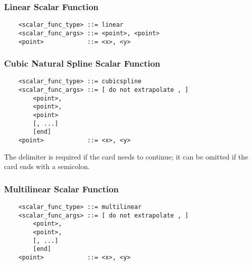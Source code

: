 \subsubsection{Linear Scalar Function}
\begin{verbatim}
    <scalar_func_type> ::= linear
    <scalar_func_args> ::= <point>, <point>
    <point>            ::= <x>, <y>
\end{verbatim}

\subsubsection{Cubic Natural Spline Scalar Function}
\begin{verbatim}
    <scalar_func_type> ::= cubicspline
    <scalar_func_args> ::= [ do not extrapolate , ]
        <point>, 
        <point>, 
        <point>
        [, ...]
        [end]
    <point>            ::= <x>, <y>
\end{verbatim}
The  delimiter is required if the card needs to continue;
it can be omitted if the card ends with a semicolon.

\subsubsection{Multilinear Scalar Function}
\begin{verbatim}
    <scalar_func_type> ::= multilinear
    <scalar_func_args> ::= [ do not extrapolate , ]
        <point>, 
        <point>, 
        [, ...]
        [end]
    <point>            ::= <x>, <y>
\end{verbatim}

